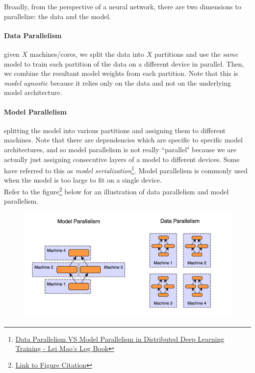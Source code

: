 \documentclass{article}
\begin{document}
Broadly, from the perspective of a neural network, there are two dimensions to parallelize: the data and the model.

\paragraph{Data Parallelism} given $X$ machines/cores, we split the data into $X$ partitions and use the \textit{same} model to train each partition of the data on a different device in parallel. Then, we combine the resultant model weights from each partition. Note that this is \textit{model agnostic} because it relies only on the data and not on the underlying model architecture.

\paragraph{Model Parallelism} splitting the model into various partitions and assigning them to different machines. Note that there are dependencies which are specific to specific model architectures, and so model parallelism is not really ``parallel" because we are actually just assigning consecutive layers of a model to different devices. Some have referred to this as \textit{model serialization}\footnote{\href{https://leimao.github.io/blog/Data-Parallelism-vs-Model-Paralelism/}{Data Parallelism VS Model Parallelism in Distributed Deep Learning Training - Lei Mao's Log Book}}. Model parallelism is commonly used when the model is too large to fit on a single device. \\

\noindent Refer to the figure\footnote{\href{https://xiandong79.github.io/Intro-Distributed-Deep-Learning}{Link to Figure Citation}} below for an illustration of data parallelism and model parallelism.

\begin{figure}[h]
\includegraphics[scale = 0.5]{background}
\centering
\end{figure}
\end{document}
